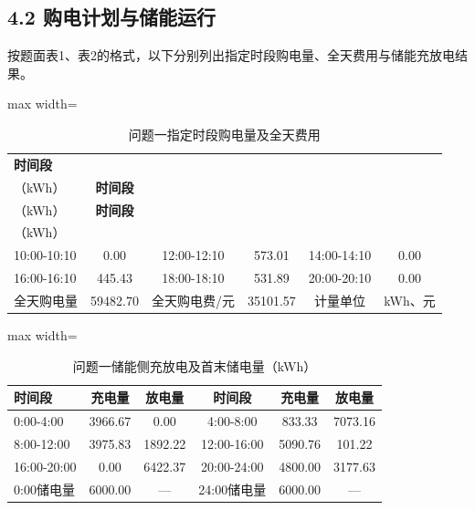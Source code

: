 \documentclass[UTF8,a4paper,zihao=-4,fontset=windows]{ctexart}
\begin{document}
\subsection{4.2 购电计划与储能运行}
按题面表1、表2的格式，以下分别列出指定时段购电量、全天费用与储能充放电结果。
\par
\begin{table}[H]\centering
\fontsize{9.5}{12}\selectfont\setlength{\tabcolsep}{4pt}\renewcommand{\arraystretch}{1.12}
\begin{adjustbox}{max width=\linewidth}\begin{tabular}{lccccc}\toprule
\textbf{时间段} & \shortstack{\textbf{购电量}\\{\normalfont （kWh）}} & \textbf{时间段} & \shortstack{\textbf{购电量}\\{\normalfont （kWh）}} & \textbf{时间段} & \shortstack{\textbf{购电量}\\{\normalfont （kWh）}}\\\midrule
10:00-10:10 & 0.00 & 12:00-12:10 & 573.01 & 14:00-14:10 & 0.00\\
16:00-16:10 & 445.43 & 18:00-18:10 & 531.89 & 20:00-20:10 & 0.00\\
全天购电量 & 59482.70 & 全天购电费/元 & 35101.57 & 计量单位 & kWh、元\\
\bottomrule\end{tabular}\end{adjustbox}
\caption{问题一指定时段购电量及全天费用}
\end{table}
\begin{table}[H]\centering
\fontsize{9.5}{12}\selectfont\setlength{\tabcolsep}{4pt}\renewcommand{\arraystretch}{1.12}
\begin{adjustbox}{max width=\linewidth}\begin{tabular}{lccccc}\toprule
\textbf{时间段} & \textbf{充电量} & \textbf{放电量} & \textbf{时间段} & \textbf{充电量} & \textbf{放电量}\\\midrule
0:00-4:00 & 3966.67 & 0.00 & 4:00-8:00 & 833.33 & 7073.16\\
8:00-12:00 & 3975.83 & 1892.22 & 12:00-16:00 & 5090.76 & 101.22\\
16:00-20:00 & 0.00 & 6422.37 & 20:00-24:00 & 4800.00 & 3177.63\\
0:00储电量 & 6000.00 & — & 24:00储电量 & 6000.00 & —\\
\bottomrule\end{tabular}\end{adjustbox}
\caption{问题一储能侧充放电及首末储电量（kWh）}
\end{table}
\end{document}
